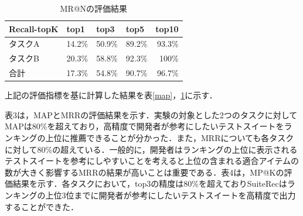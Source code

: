 \documentclass[12pt]{jarticle} %
\begin{document}
\begin{table}[h]
\caption{MR@Nの評価結果}
\label{pre}
\begin{center}
\begin{tabular}{|p{3cm}|p{2cm}|p{2cm}|p{2cm}|p{2cm}|}
\hline \hline
Recall-topK & top1 & top3 & top5 & top10 \\ \hline
タスクA & \multicolumn{1}{r|}{14.2\%} & \multicolumn{1}{r|}{50.9\%} & \multicolumn{1}{r|}{89.2\%} & \multicolumn{1}{r|}{93.3\%} \\ \hline
タスクB & \multicolumn{1}{r|}{20.3\%} & \multicolumn{1}{r|}{58.8\%} & \multicolumn{1}{r|}{92.3\%} & \multicolumn{1}{r|}{100\%} \\ \hline
合計 & \multicolumn{1}{r|}{17.3\%} & \multicolumn{1}{r|}{54.8\%} & \multicolumn{1}{r|}{90.7\%} & \multicolumn{1}{r|}{96.7\%} \\ \hline
\end{tabular}
\end{center}
\end{table}

上記の評価指標を基に計算した結果を表\ref{map}，\ref{pre}に示す．

表3は，MAPとMRRの評価結果を示す．実験の対象とした2つのタスクに対してMAPは80\%を超えており，高精度で開発者が参考にしたいテストスイートをランキングの上位に推薦できることが分かった．また，MRRについても各タスクに対して80\%の超えている．一般的に，開発者はランキングの上位に表示されるテストスイートを参考にしやすいことを考えると上位の含まれる適合アイテムの数が大きく影響するMRRの結果が高いことは重要である．表4は，MP@Kの評価結果を示す．各タスクにおいて，top3の精度は80\%を超えており{\sf SuiteRec}はランキングの上位3位までに開発者が参考にしたいテストスイートを高精度で出力することができた．
\end{document}

